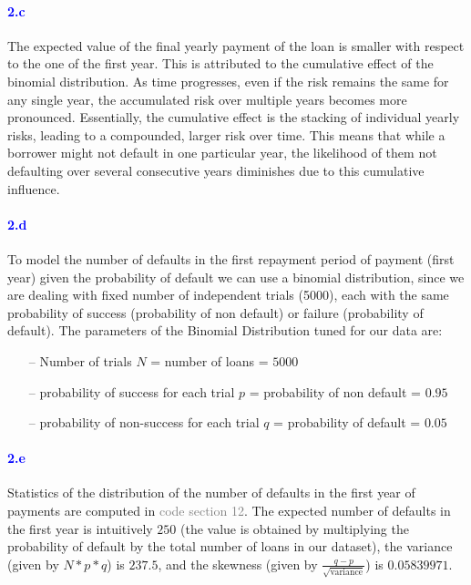 \documentclass[a4paper,12pt]{article}
\begin{document}
\paragraph{\textcolor{Blue}{2.c}} The expected value of the final yearly payment of the loan is smaller with respect to the one of the first year. This is attributed to the cumulative effect of the binomial distribution. As time progresses, even if the risk remains the same for any single year, the accumulated risk over multiple years becomes more pronounced. Essentially, the cumulative effect is the stacking of individual yearly risks, leading to a compounded, larger risk over time. This means that while a borrower might not default in one particular year, the likelihood of them not defaulting over several consecutive years diminishes due to this cumulative influence.

\paragraph{\textcolor{Blue}{2.d}} To model the number of defaults in the first repayment period of payment (first year) given the probability of default we can use a binomial distribution, since we are dealing with fixed number of independent trials (5000), each with the same probability of success (probability of non default) or failure (probability of default). The parameters of the Binomial Distribution tuned for our data are:
\begin{itemize}
    \item[--] Number of trials $N$ = number of loans = $5000$
    \item[--] probability of success for each trial $p$  = probability of non default = $0.95$
    \item[--] probability of non-success for each trial $q$  = probability of default = $0.05$
\end{itemize}

\paragraph{\textcolor{Blue}{2.e}} Statistics of the distribution of the number of defaults in the first year of payments are computed in \textcolor{gray}{code section 12}. The expected number of defaults in the first year is intuitively $250$ (the value is obtained by multiplying the probability of default by the total number of loans in our dataset), the variance (given by $N * p * q$) is $237.5$, and the skewness (given by $\frac{q - p}{\sqrt{\text{variance}}}$) is $0.05839971$.
\end{document}
